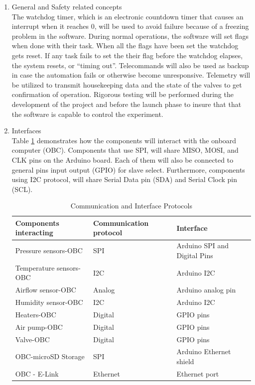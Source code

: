\documentclass[a4paper,12pt,twoside]{article}
\providecommand{\DIFaddtex}[1]{{\protect\color{blue}\uwave{#1}}} %
\providecommand{\DIFaddFL}[1]{\DIFadd{#1}} %
\providecommand{\DIFaddbeginFL}{} %
\providecommand{\DIFaddendFL}{} %
\providecommand{\DIFadd}[1]{\texorpdfstring{\DIFaddtex{#1}}{#1}} %
\newcommand{\DIFaddincludegraphics}[2][]{{\color{blue}\fbox{\DIFOincludegraphics[#1]{#2}}}} %
\DeclareRobustCommand{\DIFaddbeginFL}{\DIFOaddbeginFL \let\includegraphics\DIFaddincludegraphics} %
\DeclareRobustCommand{\DIFaddendFL}{\DIFOaddendFL \let\includegraphics\DIFOincludegraphics} %
\begin{document}
\begin{enumerate}[label=(\alph*)]
\item{General and Safety related concepts}\\
The watchdog timer, which is an electronic countdown timer that causes an interrupt when it reaches 0, will be used to avoid failure because of a freezing problem in the software. During normal operations, the software will set flags when done with their task. When all the flags have been set the watchdog gets reset. If any task fails to set the their flag before the watchdog elapses, the system resets, or \enquote{timing out}. Telecommands will also be used as backup in case the automation fails or otherwise become unresponsive. Telemetry will be utilized to transmit housekeeping data and the state of the valves to get confirmation of operation. Rigorous testing will be performed during the development of the project and before the launch phase to insure that that the software is capable to control the experiment.
\item{Interfaces}\\
Table \ref{tab:comIntpro} demonstrates how the components will interact with the onboard computer (OBC). Components that use SPI, will share MISO, MOSI, and CLK pins on the Arduino board. Each of them will also be connected to general pins input output (GPIO) for slave select. Furthermore, components using I2C protocol, will share Serial Data pin (SDA) and Serial Clock pin (SCL).

\begin{table}[H]
\centering
\begin{tabular}{lll}
\textbf{Components interacting} & \textbf{Communication protocol} & \textbf{Interface}                 \\ \hline
Pressure sensors-OBC   & SPI                    & Arduino SPI and Digital Pins \\
Temperature sensors-OBC        & I2C                    & Arduino I2C \\
Airflow sensor-OBC     & Analog                    & Arduino analog pin \\
Humidity sensor-OBC            & I2C                & Arduino I2C \\
Heaters-OBC            & Digital                & GPIO pins \\
Air pump-OBC           & Digital                & GPIO pins \\
Valve-OBC              & Digital                & GPIO pins                 \\
OBC-microSD Storage    & SPI                    & Arduino Ethernet shield   \\
OBC - E-Link           & Ethernet               & Ethernet port            
\end{tabular}%
\caption{Communication and Interface Protocols\DIFaddbeginFL \DIFaddFL{.}\DIFaddendFL }
\label{tab:comIntpro}
\end{table}


\end{enumerate}
\end{document}
